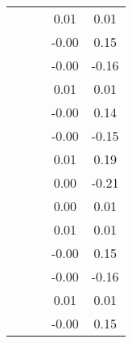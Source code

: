 \begin{table}
\begin{tabular}{c|cc|cc|}
\multicolumn{1}{|c|}{} & \multicolumn{1}{|c|}{} & \multicolumn{1}{|c|}{} & \multicolumn{1}{|c|}{      0.01} & \multicolumn{1}{|c|}{      0.01} \\ 
\multicolumn{1}{|c|}{} & \multicolumn{1}{|c|}{} & \multicolumn{1}{|c|}{} & \multicolumn{1}{|c|}{     -0.00} & \multicolumn{1}{|c|}{      0.15} \\ 
\multicolumn{1}{|c|}{} & \multicolumn{1}{|c|}{} & \multicolumn{1}{|c|}{} & \multicolumn{1}{|c|}{     -0.00} & \multicolumn{1}{|c|}{     -0.16} \\ 
\multicolumn{1}{|c|}{} & \multicolumn{1}{|c|}{} & \multicolumn{1}{|c|}{} & \multicolumn{1}{|c|}{      0.01} & \multicolumn{1}{|c|}{      0.01} \\ 
\multicolumn{1}{|c|}{} & \multicolumn{1}{|c|}{} & \multicolumn{1}{|c|}{} & \multicolumn{1}{|c|}{     -0.00} & \multicolumn{1}{|c|}{      0.14} \\ 
\multicolumn{1}{|c|}{} & \multicolumn{1}{|c|}{} & \multicolumn{1}{|c|}{} & \multicolumn{1}{|c|}{     -0.00} & \multicolumn{1}{|c|}{     -0.15} \\ 
\multicolumn{1}{|c|}{} & \multicolumn{1}{|c|}{} & \multicolumn{1}{|c|}{} & \multicolumn{1}{|c|}{      0.01} & \multicolumn{1}{|c|}{      0.19} \\ 
\multicolumn{1}{|c|}{} & \multicolumn{1}{|c|}{} & \multicolumn{1}{|c|}{} & \multicolumn{1}{|c|}{      0.00} & \multicolumn{1}{|c|}{     -0.21} \\ 
\multicolumn{1}{|c|}{} & \multicolumn{1}{|c|}{} & \multicolumn{1}{|c|}{} & \multicolumn{1}{|c|}{      0.00} & \multicolumn{1}{|c|}{      0.01} \\ 
\multicolumn{1}{|c|}{} & \multicolumn{1}{|c|}{} & \multicolumn{1}{|c|}{} & \multicolumn{1}{|c|}{      0.01} & \multicolumn{1}{|c|}{      0.01} \\ 
\multicolumn{1}{|c|}{} & \multicolumn{1}{|c|}{} & \multicolumn{1}{|c|}{} & \multicolumn{1}{|c|}{     -0.00} & \multicolumn{1}{|c|}{      0.15} \\ 
\multicolumn{1}{|c|}{} & \multicolumn{1}{|c|}{} & \multicolumn{1}{|c|}{} & \multicolumn{1}{|c|}{     -0.00} & \multicolumn{1}{|c|}{     -0.16} \\ 
\multicolumn{1}{|c|}{} & \multicolumn{1}{|c|}{} & \multicolumn{1}{|c|}{} & \multicolumn{1}{|c|}{      0.01} & \multicolumn{1}{|c|}{      0.01} \\ 
\multicolumn{1}{|c|}{} & \multicolumn{1}{|c|}{} & \multicolumn{1}{|c|}{} & \multicolumn{1}{|c|}{     -0.00} & \multicolumn{1}{|c|}{      0.15} \\ 

\end{tabular}
\end{table}
